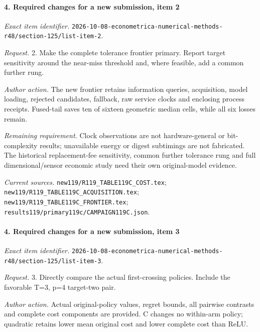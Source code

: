 \paragraph{4. Required changes for a new submission, item 2}

\emph{Exact item identifier.} \nolinkurl{2026-10-08-econometrica-numerical-methods-r48/section-125/list-item-2}.

\par\emph{Request.} 2. Make the complete tolerance frontier primary. Report target sensitivity around the near-miss threshold and, where feasible, add a common further rung.

\par\emph{Author action.} The new frontier retains information queries, acquisition, model loading, rejected candidates, fallback, raw service clocks and enclosing process receipts. Fused-tail saves ten of sixteen geometric median cells, while all six losses remain.

\par\emph{Remaining requirement.} Clock observations are not hardware-general or bit-complexity results; unavailable energy or digest subtimings are not fabricated. The historical replacement-fee sensitivity, common further tolerance rung and full dimensional/\allowbreak{}sensor economic study need their own original-model evidence.

\par\emph{Current sources.} \nolinkurl{new119/R119_TABLE119C_COST.tex}; \nolinkurl{new119/R119_TABLE119C_ACQUISITION.tex}; \nolinkurl{new119/R119_TABLE119C_FRONTIER.tex}; \nolinkurl{results119/primary119c/CAMPAIGN119C.json}.

\paragraph{4. Required changes for a new submission, item 3}

\emph{Exact item identifier.} \nolinkurl{2026-10-08-econometrica-numerical-methods-r48/section-125/list-item-3}.

\par\emph{Request.} 3. Directly compare the actual first-crossing policies. Include the favorable T=3, p=4 target-two pair.

\par\emph{Author action.} Actual original-policy values, regret bounds, all pairwise contrasts and complete cost components are provided. C changes no within-arm policy; quadratic retains lower mean original cost and lower complete cost than ReLU.

